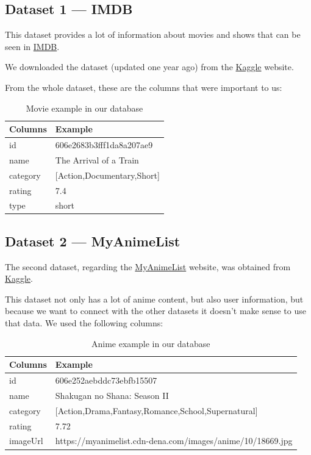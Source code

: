 \documentclass[oneside]{article}
\newcommand*\fpar{\hspace{1ex}}
\begin{document}
  \subsection{Dataset 1 — IMDB}
  \label{sec:movies}
  \fpar This dataset provides a lot of information about movies and shows that can be seen in \href{https://www.imdb.com}{IMDB}.
  \par We downloaded the dataset (updated one year ago) from the \href{https://www.kaggle.com/ashirwadsangwan/imdb-dataset}{Kaggle} website.
  \par From the whole dataset, these are the columns that were important to us:
  \begin{table}[H]
    \centering
    \begin{tabular}{l|l}
      Columns & Example                     \\ \hline
      id      & 606e2683b3fff1da8a207ae9    \\
      name    & The Arrival of a Train      \\
      category& [Action,Documentary,Short]  \\
      rating  & 7.4                         \\
      type    & short
    \end{tabular}
    \caption{Movie example in our database}
    \label{table:movie}
  \end{table}

  \subsection{Dataset 2 — MyAnimeList}
  \label{sec:animes}
  \fpar The second dataset, regarding the \href{https://myanimelist.net/}{MyAnimeList} website, was obtained from \href{https://www.kaggle.com/azathoth42/myanimelist}{Kaggle}.
  \par This dataset not only has a lot of anime content, but also user information, but because we want to connect with the other datasets it doesn't make sense to use that data. We used the following columns:
  \begin{table}[H]
    \centering
    \begin{tabular}{l|l}
      Columns & Example                       \\ \hline
      id      & 606e252aebddc73ebfb15507      \\
      name    & Shakugan no Shana: Season II  \\
      category& [Action,Drama,Fantasy,Romance,School,Supernatural]  \\
      rating  & 7.72                          \\
      imageUrl& https://myanimelist.cdn-dena.com/images/anime/10/18669.jpg
    \end{tabular}
    \caption{Anime example in our database}
    \label{table:anime}
  \end{table}
\end{document}
